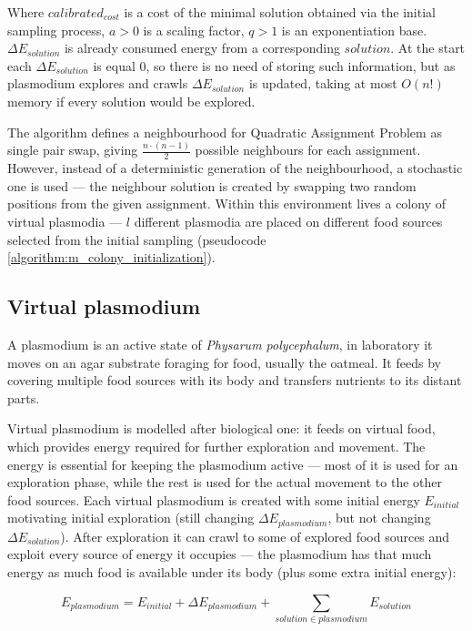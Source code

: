 Where $calibrated_{cost}$ is a cost of the minimal solution obtained via the initial sampling process, $a > 0$ is a scaling factor, $q > 1$ is an exponentiation base. ${\Delta}E_{solution}$ is already consumed energy from a corresponding $solution$. At the start each ${\Delta}E_{solution}$ is equal $0$, so there is no need of storing such information, but as plasmodium explores and crawls ${\Delta}E_{solution}$ is updated, taking at most $O(n!)$ memory if every solution would be explored.

The algorithm defines a neighbourhood for Quadratic Assignment Problem as single pair swap, giving $\frac{n\cdot(n-1)}{2}$ possible neighbours for each assignment. However, instead of a deterministic generation of the neighbourhood, a stochastic one is used --- the neighbour solution is created by swapping two random positions from the given assignment. Within this environment lives a colony of virtual plasmodia --- $l$ different plasmodia are placed on different food sources selected from the initial sampling (pseudocode \ref{algorithm:m_colony_initialization}). 

\subsection{Virtual plasmodium}

A plasmodium is an active state of \textit{Physarum polycephalum}, in laboratory it moves on an agar substrate foraging for food, usually the oatmeal. It feeds by covering multiple food sources with its body and transfers nutrients to its distant parts.

Virtual plasmodium is modelled after biological one: it feeds on virtual food, which provides energy required for further exploration and movement. The energy is essential for keeping the plasmodium active --- most of it is used for an exploration phase, while the rest is used for the actual movement to the other food sources. Each virtual plasmodium is created with some initial energy $E_{initial}$ motivating initial exploration (still changing ${\Delta}E_{plasmodium}$, but not changing ${\Delta}E_{solution}$). After exploration it can crawl to some of explored food sources and exploit every source of energy it occupies --- the plasmodium has that much energy as much food is available under its body (plus some extra initial energy):

\begin{equation}
  E_{plasmodium} = E_{initial} + {\Delta}E_{plasmodium} + \sum\limits_{solution \in plasmodium} E_{solution}
\end{equation}

